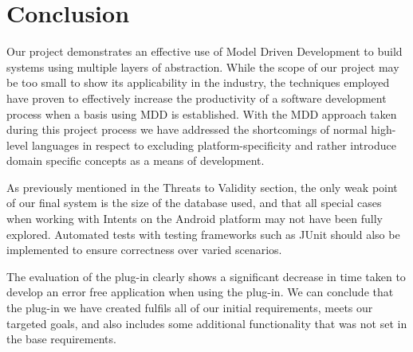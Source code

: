 \section{Conclusion}
\label{conclusion}

Our project demonstrates an effective use of Model Driven Development to build systems using multiple layers of abstraction. While the scope of our project may be too small to show its applicability in the industry, the techniques employed have proven to effectively increase the productivity of a software development process when a basis using MDD is established.
With the MDD approach taken during this project process we have addressed the shortcomings of normal high-level languages in respect to excluding platform-specificity and rather introduce domain specific concepts as a means of development. 

As previously mentioned in the Threats to Validity section, the only weak point of our final system is the size of the database used, and that all special cases when working with Intents on the Android platform may not have been fully explored. Automated tests with testing frameworks such as JUnit should also be implemented to ensure correctness over varied scenarios.

The evaluation of the plug-in clearly shows a significant decrease in time taken to develop an error free application when using the plug-in. We can conclude that the plug-in we have created fulfils all of our initial requirements, meets our targeted goals, and also includes some additional functionality that was not set in the base requirements.